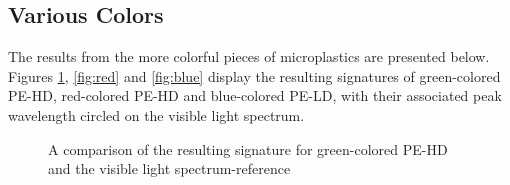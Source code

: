 \subsection{Various Colors}
The results from the more colorful pieces of microplastics are presented below. Figures \ref{fig:green}, \ref{fig:red} and \ref{fig:blue} display the resulting signatures of green-colored PE-HD, red-colored PE-HD and blue-colored PE-LD, with their associated peak wavelength circled on the visible light spectrum.  
\begin{figure}[H]
  \newcommand*\FigVSkip{0.5em}
  \newcommand*\FigHSkip{0.1em}
  \newsavebox\FigBox
  \centering
  \begin{minipage}{\wd\FigBox}
    \centering\usebox{\FigBox}
  \end{minipage}
  \begin{minipage}{\wd\FigBox}
    \centering\usebox{\FigBox}
  \end{minipage}
  \caption{A comparison of the resulting signature for green-colored PE-HD and the visible light spectrum-reference}
  \label{fig:green}
\end{figure}

